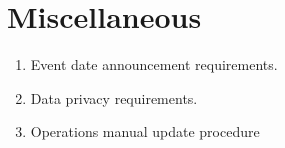 \chapter{Miscellaneous}
\begin{enumerate}
\item Event date announcement requirements.
\item Data privacy requirements.
\item Operations manual update procedure
\end{enumerate}
